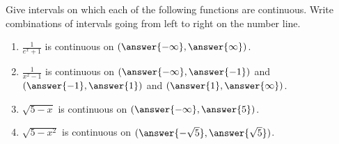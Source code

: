 \documentclass{ximera}
\author{Gregory Hartman \and Matthew Carr}
\begin{document}
\begin{exercise}



Give intervals on which each of the following functions are
continuous. Write combinations of intervals going from left to right
on the number line.

\begin{enumerate}
\item $\frac{1}{e^x+1}$ is continuous on $(\answer{-\infty},\answer{\infty})$.
\item $\frac{1}{x^2-1}$ is continuous on $(\answer{-\infty},\answer{-1})$ and $(\answer{-1},\answer{1})$ and $(\answer{1},\answer{\infty})$.
\item $\sqrt{5-x}$ is continuous on $(\answer{-\infty},\answer{5})$.
\item $\sqrt{5-x^2}$ is continuous on $(\answer{-\sqrt{5}},\answer{\sqrt{5}})$.
\end{enumerate}

\end{exercise}
\end{document}
